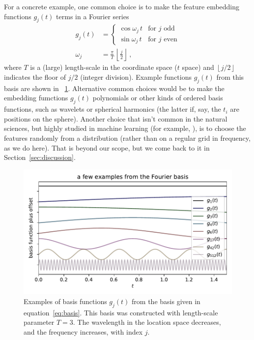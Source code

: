 \documentclass[12pt,letterpaper]{article}
\newlength{\figurewidth}
\newcommand{\floor}[1]{\left\lfloor #1 \right\rfloor}
\newcommand{\sectionname}{Section}
\begin{document}
For a concrete example, one common choice is to make the feature embedding functions $g_j(t)$ terms in a Fourier series
\begin{align}\label{eq:basis}
    g_j(t) &= \left\{\begin{array}{ll}
            \cos\omega_j\,t & \mbox{for $j$ odd} \\
            \sin\omega_j\,t & \mbox{for $j$ even}\end{array}\right.
    \\
    \omega_j &= \frac{\pi}{T}\,\floor{\frac{j}{2}}
    ~,
\end{align}
where $T$ is a (large) length-scale in the coordinate space ($t$ space) and $\floor{j/2}$ indicates the floor of $j/2$ (integer division).
Example functions $g_j(t)$ from this basis are shown in \figurename~\ref{fig:basis}.
Alternative common choices would be to make the embedding fumctions $g_j(t)$ polynomials or other kinds of ordered basis functions, such as wavelets or spherical harmonics (the latter if, say, the $t_i$ are positions on the sphere).
Another choice that isn't common in the natural sciences, but highly studied in machine learning (for example, \cite{rahimi2007random}), is to choose the features randomly from a distribution (rather than on a regular grid in frequency, as we do here). That is beyond our scope, but we come back to it in \sectionname~\ref{sec:discussion}.
\begin{figure}[t]
    \begin{mdframed}
    \includegraphics[width=\figurewidth]{paper/fourier.pdf}
    \caption{Examples of basis functions $g_j(t)$ from the basis given in equation~\eqref{eq:basis}. This basis was constructed with length-scale parameter $T=3$. The wavelength in the location space decreases, and the frequency increases, with index $j$.}
    \label{fig:basis}
    \end{mdframed}
\end{figure}
\end{document}
